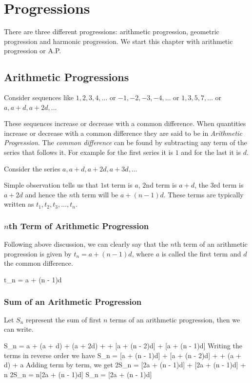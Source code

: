 \chapter{Progressions}
There are three different progressions: arithmetic progression, geometric progression and harmonic progression. We start this
chapter with arithmetic progression or A.P.

\section{Arithmetic Progressions}
Consider sequences like $1, 2, 3, 4, \ldots$ or $-1, -2, -3, -4, \ldots$ or $1, 3, 5, 7, \ldots$ or $a, a + d, a + 2d, \ldots$

These sequences increase or decrease with a common difference. When quantities increase or decrease with a common difference they
are said to be in {\it Arithmetic Progression}. The {\it common difference} can be found by subtracting any term of the
series that follows it. For example for the first series it is $1$ and for the last it is $d$.

Consider the series $a, a + d, a + 2d, a + 3d, \ldots$

Simple observation tells us that $1$st term is $a$, $2$nd term is $a + d$, the $3$rd term is $a + 2d$ and hence the $n$th term will
be $a + (n - 1)d$. These terms are typically written as $t_1, t_2, t_3, \ldots, t_n$.

\subsection{$n$th Term of Arithmetic Progression}
Following above discussion, we can clearly say that the $n$th term of an arithmetic progression is given by $t_n = a + (n - 1)d$,
where $a$ is called the first term and $d$ the common difference.

\placeformula\startformula t_n = a + (n - 1)d\stopformula

\subsection{Sum of an Arithmetic Progression}
Let $S_n$ represent the sum of first $n$ terms of an arithmetic progression, then we can write.

\startformula S_n = a + (a + d) + (a + 2d) + \cdots + [a + (n - 2)d] + [a + (n - 1)d]\stopformula
Writing the terms in reverse order we have
\startformula S_n = [a + (n - 1)d] + [a + (n - 2)d] + \cdots + (a + d) + a\stopformula
Adding term by term, we get
\startformula 2S_n = [2a + (n - 1)d] + [2a + (n - 1)d] + \cdots{}n\stopformula
  \startformula 2S_n = n[2a + (n - 1)d]\stopformula
\placeformula\startformula S_n = [2a + (n - 1)d]\stopformula


